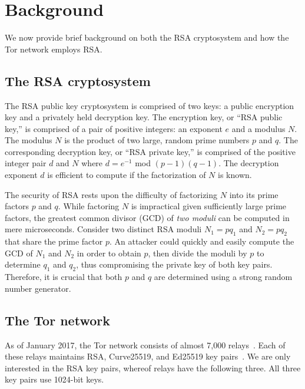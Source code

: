 \section{Background}
\label{sec:background}
We now provide brief background on both the RSA cryptosystem and how the Tor
network employs RSA.

\subsection{The RSA cryptosystem}
The RSA public key cryptosystem is comprised of two keys: a public encryption
key and a privately held decryption key. The encryption key, or ``RSA public
key,'' is comprised of a pair of positive integers: an exponent $e$ and a modulus
$N$. The modulus $N$ is the product of two large, random prime numbers $p$ and
$q$. The corresponding decryption key, or ``RSA private key,'' is comprised of the
positive integer pair $d$ and $N$ where $d = e^{-1}$ mod $(p - 1)(q - 1)$.  The
decryption exponent $d$ is efficient to compute if the factorization of $N$ is
known.

The security of RSA rests upon the difficulty of factorizing $N$ into its prime
factors $p$ and $q$.  While factoring $N$ is impractical given sufficiently
large prime factors, the greatest common divisor (GCD) of \emph{two moduli} can
be computed in mere microseconds.  Consider two distinct RSA moduli $N_1 = pq_1$
and $N_2 = pq_2$ that share the prime factor $p$.  An attacker could quickly and
easily compute the GCD of $N_1$ and $N_2$ in order to obtain $p$, then divide
the moduli by $p$ to determine $q_1$ and $q_2$, thus compromising the private
key of both key pairs.  Therefore, it is crucial that both $p$ and $q$ are
determined using a strong random number generator.

\subsection{The Tor network}
As of January 2017, the Tor network consists of almost 7,000
relays~\cite{tormetrics}.  Each of these relays maintains RSA, Curve25519, and
Ed25519 key pairs~\cite[\S~1.1]{torspec}.  We are only interested in the
RSA key pairs, whereof relays have the following three.  All three key pairs use
1024-bit keys.

